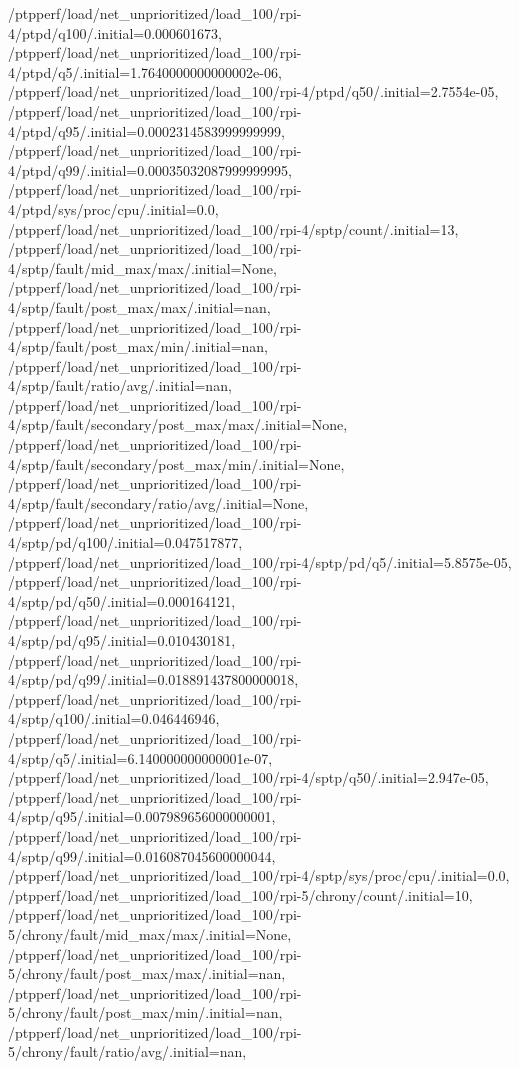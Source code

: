 {    /ptpperf/load/net_unprioritized/load_100/rpi-4/ptpd/q100/.initial=0.000601673,
    /ptpperf/load/net_unprioritized/load_100/rpi-4/ptpd/q5/.initial=1.7640000000000002e-06,
    /ptpperf/load/net_unprioritized/load_100/rpi-4/ptpd/q50/.initial=2.7554e-05,
    /ptpperf/load/net_unprioritized/load_100/rpi-4/ptpd/q95/.initial=0.0002314583999999999,
    /ptpperf/load/net_unprioritized/load_100/rpi-4/ptpd/q99/.initial=0.00035032087999999995,
    /ptpperf/load/net_unprioritized/load_100/rpi-4/ptpd/sys/proc/cpu/.initial=0.0,
    /ptpperf/load/net_unprioritized/load_100/rpi-4/sptp/count/.initial=13,
    /ptpperf/load/net_unprioritized/load_100/rpi-4/sptp/fault/mid_max/max/.initial=None,
    /ptpperf/load/net_unprioritized/load_100/rpi-4/sptp/fault/post_max/max/.initial=nan,
    /ptpperf/load/net_unprioritized/load_100/rpi-4/sptp/fault/post_max/min/.initial=nan,
    /ptpperf/load/net_unprioritized/load_100/rpi-4/sptp/fault/ratio/avg/.initial=nan,
    /ptpperf/load/net_unprioritized/load_100/rpi-4/sptp/fault/secondary/post_max/max/.initial=None,
    /ptpperf/load/net_unprioritized/load_100/rpi-4/sptp/fault/secondary/post_max/min/.initial=None,
    /ptpperf/load/net_unprioritized/load_100/rpi-4/sptp/fault/secondary/ratio/avg/.initial=None,
    /ptpperf/load/net_unprioritized/load_100/rpi-4/sptp/pd/q100/.initial=0.047517877,
    /ptpperf/load/net_unprioritized/load_100/rpi-4/sptp/pd/q5/.initial=5.8575e-05,
    /ptpperf/load/net_unprioritized/load_100/rpi-4/sptp/pd/q50/.initial=0.000164121,
    /ptpperf/load/net_unprioritized/load_100/rpi-4/sptp/pd/q95/.initial=0.010430181,
    /ptpperf/load/net_unprioritized/load_100/rpi-4/sptp/pd/q99/.initial=0.018891437800000018,
    /ptpperf/load/net_unprioritized/load_100/rpi-4/sptp/q100/.initial=0.046446946,
    /ptpperf/load/net_unprioritized/load_100/rpi-4/sptp/q5/.initial=6.140000000000001e-07,
    /ptpperf/load/net_unprioritized/load_100/rpi-4/sptp/q50/.initial=2.947e-05,
    /ptpperf/load/net_unprioritized/load_100/rpi-4/sptp/q95/.initial=0.007989656000000001,
    /ptpperf/load/net_unprioritized/load_100/rpi-4/sptp/q99/.initial=0.016087045600000044,
    /ptpperf/load/net_unprioritized/load_100/rpi-4/sptp/sys/proc/cpu/.initial=0.0,
    /ptpperf/load/net_unprioritized/load_100/rpi-5/chrony/count/.initial=10,
    /ptpperf/load/net_unprioritized/load_100/rpi-5/chrony/fault/mid_max/max/.initial=None,
    /ptpperf/load/net_unprioritized/load_100/rpi-5/chrony/fault/post_max/max/.initial=nan,
    /ptpperf/load/net_unprioritized/load_100/rpi-5/chrony/fault/post_max/min/.initial=nan,
    /ptpperf/load/net_unprioritized/load_100/rpi-5/chrony/fault/ratio/avg/.initial=nan,
}

